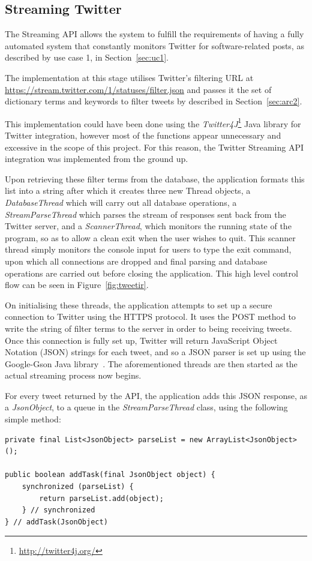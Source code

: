 \subsection{Streaming Twitter}
The Streaming API allows the system to fulfill the requirements of having a fully automated system that constantly monitors Twitter for software-related posts, as described by use case 1, in Section~\ref{sec:uc1}. 

The implementation at this stage utilises Twitter's filtering URL at \url{https://stream.twitter.com/1/statuses/filter.json} and passes it the set of dictionary terms and keywords to filter tweets by described in Section~\ref{sec:arc2}.

This implementation could have been done using the \emph{Twitter4J}\footnote{\url{http://twitter4j.org/}} Java library for Twitter integration, however most of the functions appear unnecessary and excessive in the scope of this project. For this reason, the Twitter Streaming API integration was implemented from the ground up.

Upon retrieving these filter terms from the database, the application formats this list into a string after which it creates three new Thread objects, a \emph{DatabaseThread} which will carry out all database operations, a \emph{StreamParseThread} which parses the stream of responses sent back from the Twitter server, and a \emph{ScannerThread}, which monitors the running state of the program, so as to allow a clean exit when the user wishes to quit. This scanner thread simply monitors the console input for users to type the exit command, upon which all connections are dropped and final parsing and database operations are carried out before closing the application. This high level control flow can be seen in Figure~\ref{fig:tweetir}.

On initialising these threads, the application attempts to set up a secure connection to Twitter using the HTTPS protocol. It uses the POST method to write the string of filter terms to the server in order to being receiving tweets. Once this connection is fully set up, Twitter will return JavaScript Object Notation (JSON) strings for each tweet, and so a JSON parser is set up using the Google-Gson Java library~\cite{gson}. The aforementioned threads are then started as the actual streaming process now begins.

For every tweet returned by the API, the application adds this JSON response, as a \emph{JsonObject}, to a queue in the \emph{StreamParseThread} class, using the following simple method:
\begin{lstlisting}[caption=Adding tweets to a parse queue, label=lst:queue]
private final List<JsonObject> parseList = new ArrayList<JsonObject>();

public boolean addTask(final JsonObject object) {
    synchronized (parseList) {
        return parseList.add(object);
    } // synchronized
} // addTask(JsonObject)
\end{lstlisting}

